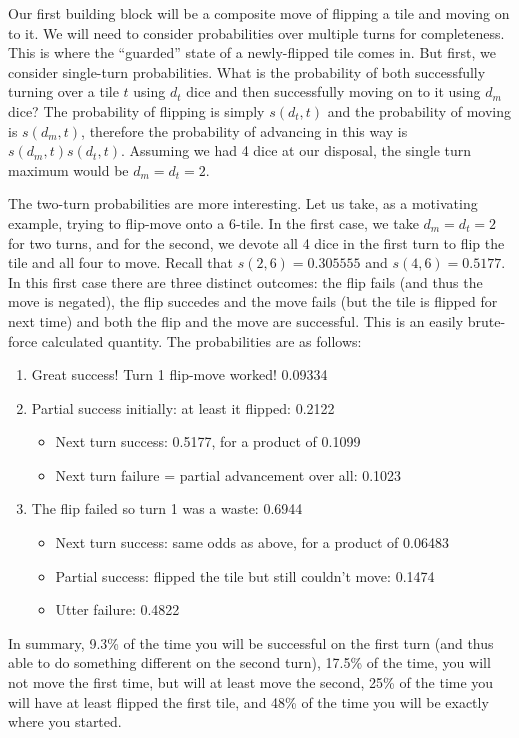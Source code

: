 \documentclass[letterpaper]{article}
\begin{document}
Our first building block will be a composite move of flipping a tile and
moving on to it.  We will need to consider probabilities over multiple turns
for completeness.  This is where the ``guarded'' state of a newly-flipped tile
comes in.  But first, we consider single-turn probabilities.  What is the
probability of both successfully turning over a tile $t$ using $d_t$ dice and
then successfully moving on to it using $d_m$ dice?  The probability of
flipping is simply $s(d_t,t)$ and the probability of moving is $s(d_m,t)$,
therefore the probability of advancing in this way is $s(d_m,t)s(d_t,t)$.
Assuming we had 4 dice at our disposal, the single turn maximum would be
$d_m=d_t=2$.  

The two-turn probabilities are more interesting.  Let us take,
as a motivating example, trying to flip-move onto a 6-tile.  In the first case,
we take $d_m=d_t=2$ for two turns, and for the second, we devote all 4 dice in
the first turn to flip the tile and all four to move.  Recall that $s(2,6) = 
0.305555$ and $s(4,6)=0.5177$.  In this first case there are three distinct
outcomes: the flip fails (and thus the move is negated), the flip succedes and
the move fails (but the tile is flipped for next time) and both the flip and
the move are successful.  This is an easily brute-force calculated quantity.
The probabilities are as follows:
\begin{enumerate}
\item Great success! Turn 1 flip-move worked! 0.09334
\item Partial success initially: at least it flipped: 0.2122
\begin{itemize}
\item Next turn success: 0.5177, for a product of 0.1099
\item Next turn failure = partial advancement over all: 0.1023
\end{itemize}
\item The flip failed so turn 1 was a waste: 0.6944
\begin{itemize}
\item Next turn success: same odds as above, for a product of 0.06483
\item Partial success: flipped the tile but still couldn't move: 0.1474
\item Utter failure: 0.4822
\end{itemize}
\end{enumerate}
In summary, 9.3\% of the time you will be successful on the first turn (and
thus able to do something different on the second turn), 17.5\% of the time, you
will not move the first time, but will at least move the second, 25\% of the
time you will have at least flipped the first tile, and 48\% of the time you
will be exactly where you started.
\end{document}
